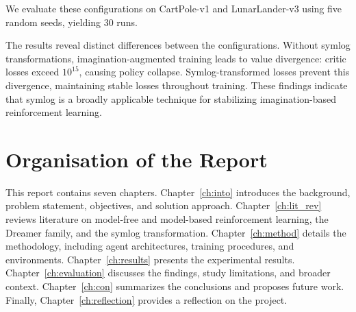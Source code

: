 \noindent We evaluate these configurations on CartPole-v1 and LunarLander-v3 using five random seeds, yielding 30 runs.

The results reveal distinct differences between the configurations. Without symlog transformations, imagination-augmented training leads to value divergence: critic losses exceed $10^{15}$, causing policy collapse. Symlog-transformed losses prevent this divergence, maintaining stable losses throughout training. These findings indicate that symlog is a broadly applicable technique for stabilizing imagination-based reinforcement learning.


\section*{Organisation of the Report}
\label{sec:intro_org}

This report contains seven chapters. Chapter~\ref{ch:into} introduces the background, problem statement, objectives, and solution approach. Chapter~\ref{ch:lit_rev} reviews literature on model-free and model-based reinforcement learning, the Dreamer family, and the symlog transformation. Chapter~\ref{ch:method} details the methodology, including agent architectures, training procedures, and environments. Chapter~\ref{ch:results} presents the experimental results. Chapter~\ref{ch:evaluation} discusses the findings, study limitations, and broader context. Chapter~\ref{ch:con} summarizes the conclusions and proposes future work. Finally, Chapter~\ref{ch:reflection} provides a reflection on the project.
